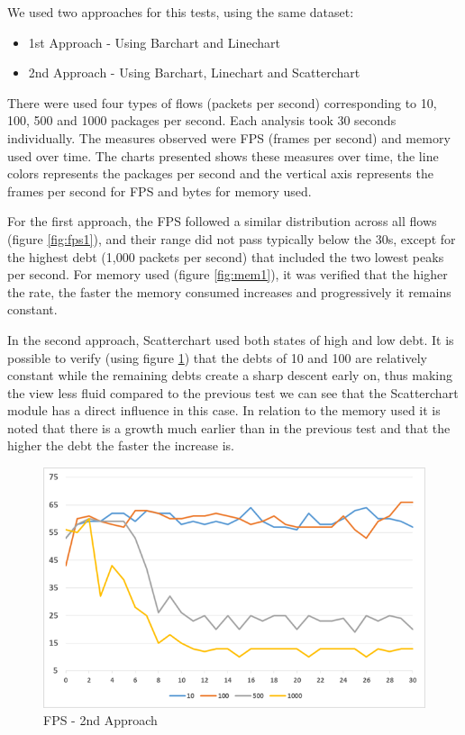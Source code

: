 \documentclass[letterpaper, 10 pt, conference]{ieeeconf}  %
\begin{document}
We used two approaches for this tests, using the same dataset:
\begin{itemize}
    \item 1st Approach - Using Barchart and Linechart
    \item 2nd Approach - Using Barchart, Linechart and Scatterchart
\end{itemize}

There were used four types of flows (packets per second) corresponding to 10, 100, 500 and 1000 packages per second. Each analysis took 30 seconds individually. The measures observed were FPS (frames per second) and memory used over time. The charts presented shows these measures over time, the line colors represents the packages per second and the vertical axis represents the frames per second for FPS and bytes for memory used.

For the first approach, the FPS followed a similar distribution across all flows (figure \ref{fig:fps1}), and their range did not pass typically below the 30s, except for the highest debt (1,000 packets per second) that included the two lowest peaks per second.
For memory used (figure \ref{fig:mem1}), it was verified that the higher the rate, the faster the memory consumed increases and progressively it remains constant.

In the second approach, Scatterchart used both states of high and low debt. It is possible to verify (using figure \ref{fig:fps2}) that the debts of 10 and 100 are relatively constant while the remaining debts create a sharp descent early on, thus making the view less fluid compared to the previous test we can see that the Scatterchart module has a direct influence in this case. In relation to the memory used it is noted that there is a growth much earlier than in the previous test and that the higher the debt the faster the increase is.

\begin{figure}[!ht]
    \centering
    \includegraphics[width=\linewidth]{Figures/fps2.png}
    \caption{FPS - 2nd Approach}
        \label{fig:fps2}
\end{figure}
\end{document}
